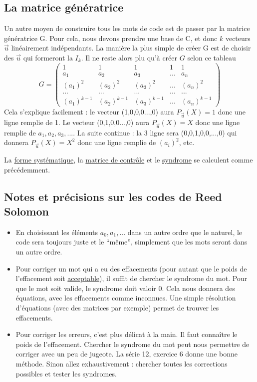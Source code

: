 \documentclass[11pt,a4paper]{article}
\renewcommand{\)}{\right)}
\renewcommand{\(}{\left(}
\begin{document}
\subsection{La matrice génératrice}
Un autre moyen de construire tous les mots de code est de passer par la matrice génératrice G. Pour cela, nous devons prendre une base de C, et donc $k$ vecteurs $\vec{u}$ linéairement indépendants. La manière la plus simple de créer G est de choisir des $\vec{u}$ qui formeront la $I_k$. Il ne reste alors plu qu'à créer $G$ selon ce tableau
	\[G = \begin{pmatrix}
	1 & 1 & 1 & 1 & 1\\
	a_1 & a_2 & a_3 & ... & a_n\\
	(a_1)^2 & (a_2)^2 & (a_3)^2 & ... & (a_n)^2\\
	... & ... & ... & ... & ...\\
	(a_1)^{k-1} & (a_2)^{k-1} & (a_3)^{k-1} & ... & (a_n)^{k-1}
	\end{pmatrix}\]
Cela s'explique facilement : le vecteur (1,0,0,0...,0) aura $P_{\vec{u}}(X) = 1$ donc une ligne remplie de 1. Le vecteur (0,1,0,0...,0) aura $P_{\vec{u}}(X) = X$ donc une ligne remplie de $a_1,a_2,a_3,...$. La suite continue : la 3 ligne sera (0,0,1,0,0,...,0) qui donnera $P_{\vec{u}}(X) = X^2$ donc une ligne remplie de $(a_i)^2$, etc. 	

La \hyperref[systematique]{forme systématique}, la \hyperref[controle]{matrice de contrôle} et le \hyperref[syndrome]{syndrome} se calculent comme précédemment.

\subsection[Notes/précisions sur Reed Solomon]{Notes et précisions sur les codes de Reed Solomon}
\begin{itemize}
	\item 	En choisissant les éléments $a_0,a_1,...$ dans un autre ordre que le naturel, le code sera toujours juste et le \enquote{même}, simplement que les mots seront dans un autre ordre.
	\item 	Pour corriger un mot qui a eu des effacements (pour autant que le poids de l'effacement soit \hyperref[canaux]{acceptable}), il suffit de chercher le syndrome du mot. Pour que le mot soit valide, le syndrome doit valoir 0. Cela nous donnera des équations, avec les effacements comme inconnues. Une simple résolution d'équations (avec des matrices par exemple) permet de trouver les effacements.
	\item 	Pour corriger les erreurs, c'est plus délicat à la main. Il faut connaître le poids de l'effacement. Chercher le syndrome du mot peut nous permettre de corriger avec un peu de jugeote. La série 12, exercice 6 donne une bonne méthode. Sinon allez exhaustivement : chercher toutes les corrections possibles et tester les syndromes.
\end{itemize}
\end{document}
